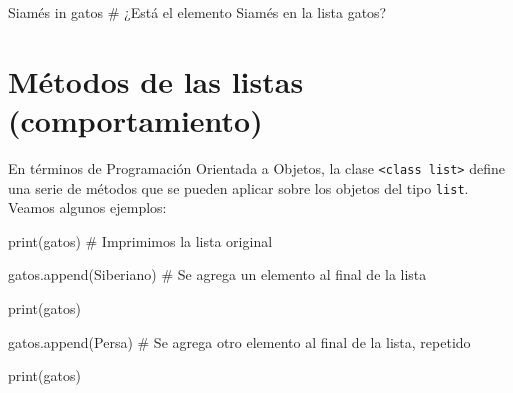 \documentclass[
  letterpaper,
  DIV=11,
  numbers=noendperiod]{scrreprt}
\newenvironment{Shaded}{\begin{snugshade}}{\end{snugshade}}
\newcommand{\BuiltInTok}[1]{\textcolor[rgb]{0.00,0.23,0.31}{#1}}
\newcommand{\CommentTok}[1]{\textcolor[rgb]{0.37,0.37,0.37}{#1}}
\newcommand{\KeywordTok}[1]{\textcolor[rgb]{0.00,0.23,0.31}{#1}}
\newcommand{\NormalTok}[1]{\textcolor[rgb]{0.00,0.23,0.31}{#1}}
\newcommand{\StringTok}[1]{\textcolor[rgb]{0.13,0.47,0.30}{#1}}
\begin{document}
\begin{Shaded}
\begin{Highlighting}[]
\CommentTok{\textquotesingle{}Siamés\textquotesingle{}} \KeywordTok{in}\NormalTok{ gatos }\CommentTok{\# ¿Está el elemento \textasciigrave{}Siamés\textasciigrave{} en la lista gatos?}
\end{Highlighting}
\end{Shaded}

\section{Métodos de las listas
(comportamiento)}\label{muxe9todos-de-las-listas-comportamiento}

En términos de Programación Orientada a Objetos, la clase
\texttt{\textless{}class\ \textquotesingle{}list\textquotesingle{}\textgreater{}}
define una serie de métodos que se pueden aplicar sobre los objetos del
tipo \texttt{list}. Veamos algunos ejemplos:

\begin{Shaded}
\begin{Highlighting}[]
\BuiltInTok{print}\NormalTok{(gatos) }\CommentTok{\# Imprimimos la lista original}
\end{Highlighting}
\end{Shaded}

\begin{Shaded}
\begin{Highlighting}[]
\NormalTok{gatos.append(}\StringTok{\textquotesingle{}Siberiano\textquotesingle{}}\NormalTok{) }\CommentTok{\# Se agrega un elemento al final de la lista}
\end{Highlighting}
\end{Shaded}

\begin{Shaded}
\begin{Highlighting}[]
\BuiltInTok{print}\NormalTok{(gatos)}
\end{Highlighting}
\end{Shaded}

\begin{Shaded}
\begin{Highlighting}[]
\NormalTok{gatos.append(}\StringTok{\textquotesingle{}Persa\textquotesingle{}}\NormalTok{) }\CommentTok{\# Se agrega otro elemento al final de la lista, repetido}
\end{Highlighting}
\end{Shaded}

\begin{Shaded}
\begin{Highlighting}[]
\BuiltInTok{print}\NormalTok{(gatos)}
\end{Highlighting}
\end{Shaded}
\end{document}
